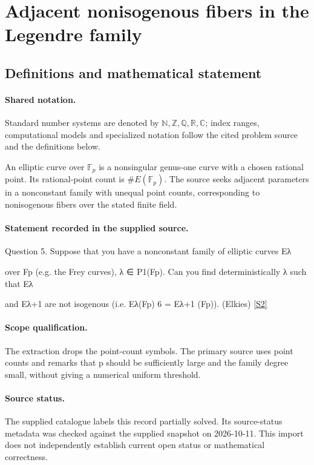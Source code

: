 \documentclass[11pt]{article}
\newcommand{\sref}[2]{\hyperlink{source:#1:#2}{[S#2]}}
\begin{document}
\section{Adjacent nonisogenous fibers in the Legendre family}\label{statement}

\subsection{Definitions and mathematical statement}

\paragraph{Shared notation.}Standard number systems are denoted by $\mathbb N,\mathbb Z,\mathbb Q,\mathbb R,\mathbb C$; index ranges, computational models and specialized notation follow the cited problem source and the definitions below.


An elliptic curve over $\mathbb F_p$ is a nonsingular genus-one curve with a chosen rational point. Its rational-point count is $\#E(\mathbb F_p)$. The source seeks adjacent parameters in a nonconstant family with unequal point counts, corresponding to nonisogenous fibers over the stated finite field.
\paragraph{Statement recorded in the supplied source.}
Question 5. Suppose that you have a nonconstant family of elliptic curves Eλ

over Fp (e.g. the Frey curves), λ ∈ P1(Fp). Can you find deterministically λ such that Eλ

and Eλ+1 are not isogenous (i.e. Eλ(Fp) 6 = Eλ+1 (Fp)). (Elkies) \sref{statement}{2}
\paragraph{Scope qualification.}
The extraction drops the point-count symbols. The primary source uses point counts and remarks that p should be sufficiently large and the family degree small, without giving a numerical uniform threshold.
\paragraph{Source status.}
The supplied catalogue labels this record partially solved. Its source-status metadata was checked against the supplied snapshot on 2026-10-11. This import does not independently establish current open status or mathematical correctness.
\end{document}

